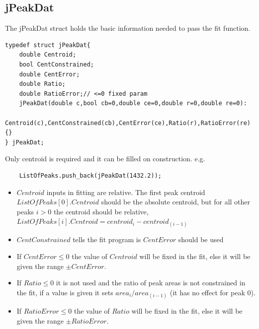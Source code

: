 \documentclass[a4paper,10pt]{article}
\begin{document}
\subsection{jPeakDat}\label{sec:jpeakdata}
The jPeakDat struct holds the basic information needed to pass the fit function.
\lstset{language=C++}
\begin{lstlisting}
typedef struct jPeakDat{
	double Centroid;
	bool CentConstrained;
	double CentError;
	double Ratio;
	double RatioError;// <=0 fixed param
	jPeakDat(double c,bool cb=0,double ce=0,double r=0,double re=0):
	Centroid(c),CentConstrained(cb),CentError(ce),Ratio(r),RatioError(re){}
} jPeakDat;
\end{lstlisting}

Only centroid is required and it can be filled on construction. e.g.
\lstset{language=C++}
\begin{lstlisting}
	ListOfPeaks.push_back(jPeakDat(1432.2));
\end{lstlisting}

\begin{itemize}
\item $Centroid$ inputs in fitting are relative. The first peak centroid $ListOfPeaks[0].Centroid$ should be the absolute centroid, but for all other peaks $i>0$ the centroid should be relative, \\$ListOfPeaks[i].Centroid = centroid_i - centroid_{(i-1)}$
\item $CentConstrained$ tells the fit program is $CentError$ should be used
\item If $CentError\leq0$ the value of $Centroid$ will be fixed in the fit, else it will be given the range $\pm CentError$.
\item If $Ratio\leq0$ it is not used and the ratio of peak areas is not constrained in the fit, if a value is given it sets $area_i/area_{(i-1)}$ (it has no effect for peak 0).
\item  If $RatioError\leq0$ the value of $Ratio$ will be fixed in the fit, else it will be given the range $\pm RatioError$.
\end{itemize}



\end{document}
